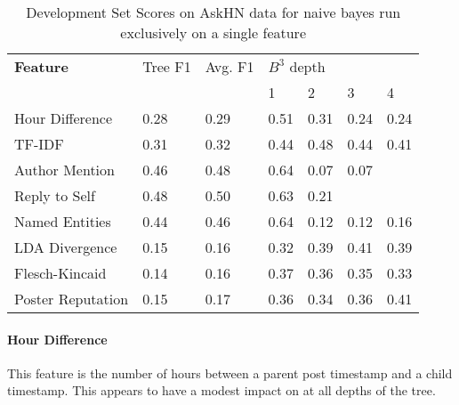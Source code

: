 \documentclass[10pt]{article}
\begin{document}
\begin{table}[h]\footnotesize
 \begin{tabular}{| l | l | l | l | l | l | l |} 
   \hline
   \textbf{Feature} & Tree F1 & Avg. F1 & \multicolumn{4}{l|}{$B^3$ depth} \\
                      & & & 1 & 2 & 3 & 4\\
   \hline
      Hour Difference & 0.28 & 0.29 & 0.51 & 0.31 & 0.24 & 0.24 \\
               TF-IDF & 0.31 & 0.32 & 0.44 & 0.48 & 0.44 & 0.41 \\ 
       Author Mention & 0.46 & 0.48 & 0.64 & 0.07 & 0.07 & \\
        Reply to Self & 0.48 & 0.50 & 0.63 & 0.21 & & \\
Named Entities & 0.44 & 0.46 & 0.64 & 0.12 & 0.12 & 0.16 \\
               LDA Divergence & 0.15 & 0.16 & 0.32 & 0.39 & 0.41 & 0.39 \\
         Flesch-Kincaid & 0.14 & 0.16 & 0.37 & 0.36 & 0.35 & 0.33 \\
            Poster Reputation & 0.15 & 0.17 & 0.36 & 0.34 & 0.36 & 0.41 \\
   \hline
  \end{tabular}
  \caption{Development Set Scores on AskHN data for naive bayes run exclusively
  on a single feature}
  \label{table:perfeature}
\end{table}

\paragraph{Hour Difference} This feature is the number of hours between a parent 
post timestamp and a child timestamp. This appears to have a modest impact on
at all depths of the tree.
\end{document}
